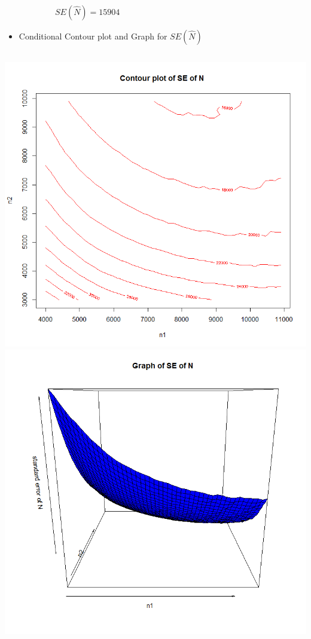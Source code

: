 \documentclass{beamer}
\begin{document}
\begin{frame}
{$\qquad \qquad \qquad SE(\hat{N}) = 15904 $
\vspace{2pt}
}
\begin{itemize}
\item  {{\scriptsize  Conditional Contour plot and Graph for $SE(\hat{N})$ }}
\end{itemize}
\begin{columns}
\hspace{1cm}\includegraphics[scale=.14]{2014_05_19Contour_plot.png}
\includegraphics[scale=.14]{2014_05_19Graph_SE_N.png}
\end{columns}

\end{frame}
\end{document}
